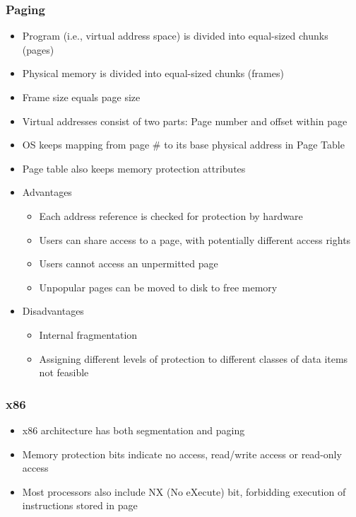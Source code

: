 \documentclass[twoside]{article}
\begin{document}
\subsubsection{Paging}
\begin{itemize}
\item Program (i.e., virtual address space) is divided into equal-sized chunks (pages)
\item Physical memory is divided into equal-sized chunks (frames)
\item Frame size equals page size
\item Virtual addresses consist of two parts: Page number and offset  within page
\item OS keeps mapping from page \(\#\) to its base physical address in Page Table
\item Page table also keeps memory protection attributes
\item Advantages
\begin{itemize}
\item Each address reference is checked for protection by
hardware
\item Users can share access to a page, with potentially
different access rights
\item Users cannot access an unpermitted page
\item Unpopular pages can be moved to disk to free memory
\end{itemize}
\item Disadvantages
\begin{itemize}
\item Internal fragmentation
\item Assigning different levels of protection to different
classes of data items not feasible
\end{itemize}
\end{itemize}


\subsubsection{x86}
\begin{itemize}
\item x86 architecture has both segmentation and paging
\item Memory protection bits indicate no access, read/write access or read-only access
\item Most processors also include NX (No eXecute) bit, forbidding execution of instructions stored in page
\end{itemize}
\end{document}
